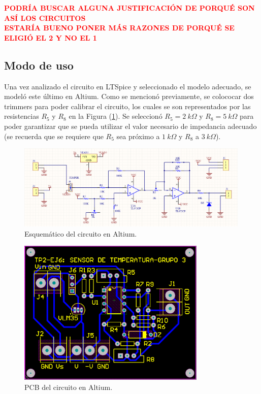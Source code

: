 \documentclass[a4paper]{article}
\begin{document}
\begin{center}
	\textcolor{red}{\textbf{PODRÍA BUSCAR ALGUNA JUSTIFICACIÓN DE PORQUÉ SON ASÍ LOS CIRCUITOS}}\\
	\textcolor{red}{\textbf{ESTARÍA BUENO PONER MÁS RAZONES DE PORQUÉ SE ELIGIÓ EL 2 Y NO EL 1}}
\end{center}

\subsection{Modo de uso}

Una vez analizado el circuito en LTSpice y seleccionado el modelo adecuado, se modeló este último en Altium. Como se mencionó previamente, se colococar dos trimmers para poder calibrar el circuito, los cuales se son representados por las resistencias $R_5$ y $R_8$ en la Figura (\ref{fig:schematic}). Se seleccionó $R_5 = 2 \ k\Omega$ y $R_8 = 5 \ k\Omega$ para poder garantizar que se pueda utilizar el valor necesario de impedancia adecuado (se recuerda que se requiere que $R_5$ sea próximo a $ 1 \ k\Omega$ y $R_8$ a $ 3 \ k\Omega$).

\begin{figure}[H]
	\centering
	\includegraphics[width=0.99\textwidth]{Ejercicio6/Imagenes/Schematic.png}
	\caption{Esquemático del circuito en Altium.}
	\label{fig:schematic}
\end{figure}

\begin{figure}[H]
	\centering
	\includegraphics[width=0.8\textwidth]{Ejercicio6/Imagenes/PCB.png}
	\caption{PCB del circuito en Altium.}
	\label{fig:PCB}
\end{figure}
\end{document}
